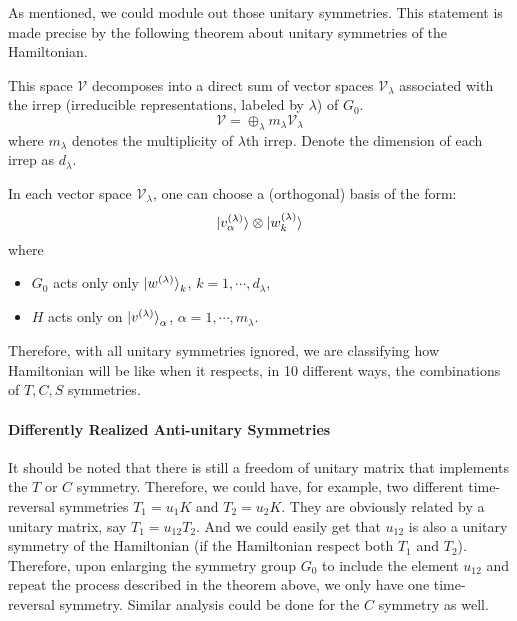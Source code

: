 As mentioned, we could module out those unitary symmetries. This statement is
made precise by the following theorem about unitary symmetries of the Hamiltonian.
\begin{thm}
	This space $\mathcal{V}$ decomposes into a direct sum of vector spaces
	$\mathcal{V}_\lambda$ associated with the irrep (irreducible
	representations, labeled by $\lambda$) of $G_0$.
	\begin{equation}
	\mathcal{V} = \oplus_\lambda m_\lambda \mathcal{V}_\lambda
	\end{equation}
	where $m_\lambda$ denotes the multiplicity of $\lambda$th irrep.
	Denote the dimension of each irrep as $d_\lambda$.
	
	In each vector space $\mathcal{V}_\lambda$, one can choose a
	(orthogonal) basis of the form:
	\begin{equation}
	\ket{v^{(\lambda)}_\alpha} \otimes \ket{w^{(\lambda)}_k}
	\end{equation}
	where
	\begin{itemize}
		\item $G_0$ acts only only $\ket{w^{(\lambda)}}_k$,
		$k=1,\cdots,d_\lambda$,
		\item $H$ acts only on $\ket{v^{(\lambda)}}_\alpha$,
		$\alpha=1,\cdots,m_\lambda$.
	\end{itemize}
\end{thm}
Therefore, with all unitary symmetries ignored, we are classifying how
Hamiltonian will be like when it respects, in 10 different ways, the
combinations of $T,C,S$ symmetries.

\paragraph{Differently Realized Anti-unitary Symmetries}
It should be noted that there is still a freedom of unitary matrix that
implements the $T$ or $C$ symmetry. Therefore, we could have, for example, two
different time-reversal symmetries $T_1 = u_1K$ and $T_2= u_2 K$. They are
obviously related by a unitary matrix, say $T_1 = u_{12} T_2$. And we could
easily get that $u_{12}$ is also a unitary symmetry of the Hamiltonian (if the
Hamiltonian respect both $T_1$ and $T_2$). Therefore, upon enlarging the
symmetry group $G_0$ to include the element $u_{12}$ and repeat the process
described in the theorem above, we only have one time-reversal symmetry. Similar
analysis could be done for the $C$ symmetry as well.

